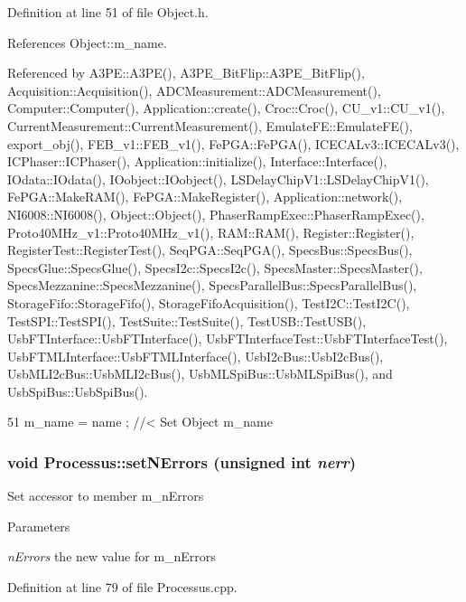 Definition at line 51 of file Object.h.

References Object::m\_\-name.

Referenced by A3PE::A3PE(), A3PE\_\-BitFlip::A3PE\_\-BitFlip(), Acquisition::Acquisition(), ADCMeasurement::ADCMeasurement(), Computer::Computer(), Application::create(), Croc::Croc(), CU\_\-v1::CU\_\-v1(), CurrentMeasurement::CurrentMeasurement(), EmulateFE::EmulateFE(), export\_\-obj(), FEB\_\-v1::FEB\_\-v1(), FePGA::FePGA(), ICECALv3::ICECALv3(), ICPhaser::ICPhaser(), Application::initialize(), Interface::Interface(), IOdata::IOdata(), IOobject::IOobject(), LSDelayChipV1::LSDelayChipV1(), FePGA::MakeRAM(), FePGA::MakeRegister(), Application::network(), NI6008::NI6008(), Object::Object(), PhaserRampExec::PhaserRampExec(), Proto40MHz\_\-v1::Proto40MHz\_\-v1(), RAM::RAM(), Register::Register(), RegisterTest::RegisterTest(), SeqPGA::SeqPGA(), SpecsBus::SpecsBus(), SpecsGlue::SpecsGlue(), SpecsI2c::SpecsI2c(), SpecsMaster::SpecsMaster(), SpecsMezzanine::SpecsMezzanine(), SpecsParallelBus::SpecsParallelBus(), StorageFifo::StorageFifo(), StorageFifoAcquisition(), TestI2C::TestI2C(), TestSPI::TestSPI(), TestSuite::TestSuite(), TestUSB::TestUSB(), UsbFTInterface::UsbFTInterface(), UsbFTInterfaceTest::UsbFTInterfaceTest(), UsbFTMLInterface::UsbFTMLInterface(), UsbI2cBus::UsbI2cBus(), UsbMLI2cBus::UsbMLI2cBus(), UsbMLSpiBus::UsbMLSpiBus(), and UsbSpiBus::UsbSpiBus().


\begin{DoxyCode}
51 { m_name  = name  ; } //< Set Object m_name
\end{DoxyCode}
\hypertarget{classProcessus_a831b027b9cf18ab56fa6147b5d3055da}{
\subsubsection[{setNErrors}]{\setlength{\rightskip}{0pt plus 5cm}void Processus::setNErrors (unsigned int {\em nerr})}}
\label{classProcessus_a831b027b9cf18ab56fa6147b5d3055da}
Set accessor to member m\_\-nErrors 
\begin{DoxyParams}{Parameters}
\item[{\em nErrors}]the new value for m\_\-nErrors \end{DoxyParams}


Definition at line 79 of file Processus.cpp.


